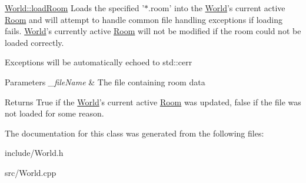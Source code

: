 \hyperlink{classGame_1_1World_a13ba8ac502ce8ff169be2920332cf291}{World\-::load\-Room} Loads the specified '$\ast$.room' into the \hyperlink{classGame_1_1World}{World}'s current active \hyperlink{classGame_1_1Room}{Room} and will attempt to handle common file handling exceptions if loading fails. \hyperlink{classGame_1_1World}{World}'s currently active \hyperlink{classGame_1_1Room}{Room} will not be modified if the room could not be loaded correctly. 

Exceptions will be automatically echoed to std\-::cerr 
\begin{DoxyParams}{Parameters}
{\em \-\_\-file\-Name} & The file containing room data \\
\hline
\end{DoxyParams}
\begin{DoxyReturn}{Returns}
True if the \hyperlink{classGame_1_1World}{World}'s current active \hyperlink{classGame_1_1Room}{Room} was updated, false if the file was not loaded for some reason. 
\end{DoxyReturn}


The documentation for this class was generated from the following files\-:\begin{DoxyCompactItemize}
\item 
include/World.\-h\item 
src/World.\-cpp\end{DoxyCompactItemize}
